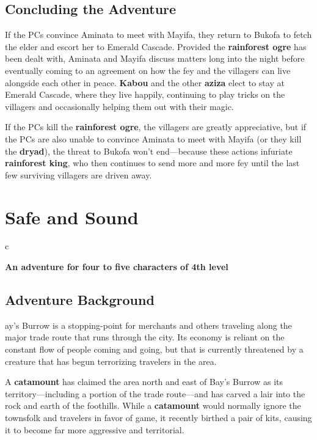 \documentclass[10pt,a4paper,twoside,bg=print,twocolumn,openany,nodeprecatedcode]{dndbook}
\begin{document}
\section{Concluding the Adventure}
If the PCs convince Aminata to meet with Mayifa, they return to Bukofa to fetch the elder and escort her to Emerald Cascade. Provided the \textbf{rainforest ogre} has been dealt with, Aminata and Mayifa discuss matters long into the night before eventually coming to an agreement on how the fey and the villagers can live alongside each other in peace. \textbf{Kabou} and the other \textbf{aziza} elect to stay at Emerald Cascade, where they live happily, continuing to play tricks on the villagers and occasionally helping them out with their magic.

If the PCs kill the \textbf{rainforest ogre}, the villagers are greatly appreciative, but if the PCs are also unable to convince Aminata to meet with Mayifa (or they kill the \textbf{dryad}), the threat to Bukofa won't end—because these actions infuriate \textbf{rainforest king}, who then continues to send more and more fey until the last few surviving villagers are driven away.

\chapter{Safe and Sound}

\begin{DndTable}{c}

\textbf{An adventure for four to five characters of 4th level}\\
\end{DndTable}

\section{Adventure Background}
ay's Burrow is a stopping-point for merchants and others traveling along the major trade route that runs through the city. Its economy is reliant on the constant flow of people coming and going, but that is currently threatened by a creature that has begun terrorizing travelers in the area.


A \textbf{catamount} has claimed the area north and east of Bay's Burrow as its territory—including a portion of the trade route—and has carved a lair into the rock and earth of the foothills. While a \textbf{catamount} would normally ignore the townsfolk and travelers in favor of game, it recently birthed a pair of kits, causing it to become far more aggressive and territorial.
\end{document}

